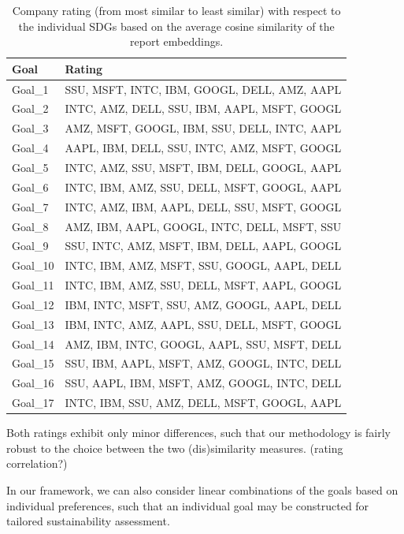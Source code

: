 \documentclass[
]{article}
\begin{document}
\begin{table}

\caption{\label{tab:tab02}Company rating (from most similar to least similar) with respect to the individual SDGs based on the average cosine similarity of the report embeddings.}
\centering
\begin{tabular}[t]{l|l}
\hline
Goal & Rating\\
\hline
Goal\_1 & SSU, MSFT, INTC, IBM, GOOGL, DELL, AMZ, AAPL\\
\hline
Goal\_2 & INTC, AMZ, DELL, SSU, IBM, AAPL, MSFT, GOOGL\\
\hline
Goal\_3 & AMZ, MSFT, GOOGL, IBM, SSU, DELL, INTC, AAPL\\
\hline
Goal\_4 & AAPL, IBM, DELL, SSU, INTC, AMZ, MSFT, GOOGL\\
\hline
Goal\_5 & INTC, AMZ, SSU, MSFT, IBM, DELL, GOOGL, AAPL\\
\hline
Goal\_6 & INTC, IBM, AMZ, SSU, DELL, MSFT, GOOGL, AAPL\\
\hline
Goal\_7 & INTC, AMZ, IBM, AAPL, DELL, SSU, MSFT, GOOGL\\
\hline
Goal\_8 & AMZ, IBM, AAPL, GOOGL, INTC, DELL, MSFT, SSU\\
\hline
Goal\_9 & SSU, INTC, AMZ, MSFT, IBM, DELL, AAPL, GOOGL\\
\hline
Goal\_10 & INTC, IBM, AMZ, MSFT, SSU, GOOGL, AAPL, DELL\\
\hline
Goal\_11 & INTC, IBM, AMZ, SSU, DELL, MSFT, AAPL, GOOGL\\
\hline
Goal\_12 & IBM, INTC, MSFT, SSU, AMZ, GOOGL, AAPL, DELL\\
\hline
Goal\_13 & IBM, INTC, AMZ, AAPL, SSU, DELL, MSFT, GOOGL\\
\hline
Goal\_14 & AMZ, IBM, INTC, GOOGL, AAPL, SSU, MSFT, DELL\\
\hline
Goal\_15 & SSU, IBM, AAPL, MSFT, AMZ, GOOGL, INTC, DELL\\
\hline
Goal\_16 & SSU, AAPL, IBM, MSFT, AMZ, GOOGL, INTC, DELL\\
\hline
Goal\_17 & INTC, IBM, SSU, AMZ, DELL, MSFT, GOOGL, AAPL\\
\hline
\end{tabular}
\end{table}

Both ratings exhibit only minor differences, such that our methodology is fairly robust to the choice between the two (dis)similarity measures. (rating correlation?)

In our framework, we can also consider linear combinations of the goals based on individual preferences, such that an individual goal may be constructed for tailored sustainability assessment.
\end{document}
